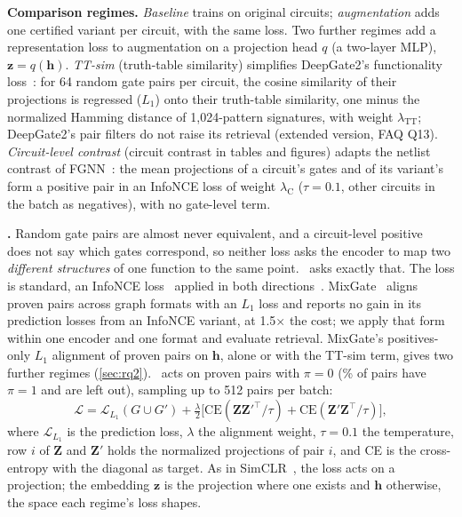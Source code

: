 \noindent\textbf{Comparison regimes.} \emph{Baseline} trains on original circuits; \emph{augmentation} adds
one certified variant per circuit, with the same loss. Two further regimes add a representation loss
to augmentation on a projection head $q$ (a two-layer MLP), $\mathbf z=q(\mathbf h)$. \emph{\mbox{TT-sim}} (truth-table similarity) simplifies
DeepGate2's functionality loss~\cite{DBLP:conf/iccad/ShiPKLLHZYCX23}: for 64 random gate pairs per circuit, the cosine similarity of their
projections is regressed ($L_1$) onto their truth-table similarity, one minus the normalized Hamming distance of
1{,}024-pattern signatures, with weight $\lambda_{\mathrm{TT}}$; DeepGate2's pair filters do not raise its retrieval
(extended version, FAQ Q13). \emph{Circuit-level contrast} (circuit contrast in tables and figures) adapts the netlist
contrast of FGNN~\cite{DBLP:conf/dac/WangBHZXHYH22}: the mean projections of a circuit's gates and of its variant's form a positive
pair in an InfoNCE loss of weight $\lambda_{\mathrm C}$ ($\tau=0.1$, other circuits in the batch as negatives),
with no gate-level term.

\noindent\textbf{\ours.} Random gate pairs are almost never equivalent, and a circuit-level positive~\cite{DBLP:conf/dac/WangBHZXHYH22,DBLP:conf/nips/ZhengLSX25}
does not say which gates correspond, so neither loss asks the encoder to map two \emph{different structures}
of one function to the same point. \ours\ asks exactly that. The loss is standard, an InfoNCE loss~\cite{DBLP:journals/corr/abs-1807-03748} applied in both
directions~\cite{DBLP:conf/icml/ChenK0H20}. MixGate~\cite{DBLP:journals/corr/abs-2509-20968} aligns proven pairs across graph formats with an $L_1$ loss and reports no gain in its prediction losses from an InfoNCE variant, at 1.5$\times$ the cost; we apply that form within one encoder and one format and evaluate retrieval. MixGate's positives-only $L_1$ alignment of proven pairs on $\mathbf h$, alone or with the TT-sim
term, gives two further regimes (\cref{sec:rq2}). \ours\ acts on proven pairs with $\pi=0$ (\ComplPct\% of pairs have $\pi=1$ and are left out), sampling up to 512 pairs per batch:
\begin{equation}
\mathcal L=\mathcal L_{L_1}(G\cup G')+\tfrac{\lambda}{2}\big[\mathrm{CE}(\mathbf Z\mathbf Z'^{\top}/\tau)+\mathrm{CE}(\mathbf Z'\mathbf Z^{\top}/\tau)\big],
\end{equation}
where $\mathcal L_{L_1}$ is the prediction loss, $\lambda$ the alignment weight, $\tau=0.1$ the temperature, row $i$ of $\mathbf Z$ and $\mathbf Z'$ holds the normalized projections of pair $i$, and CE is the
cross-entropy with the diagonal as target. As in SimCLR~\cite{DBLP:conf/icml/ChenK0H20}, the loss acts on a projection; the embedding $\mathbf z$ is the projection
where one exists and $\mathbf h$ otherwise, the space each regime's loss shapes.

